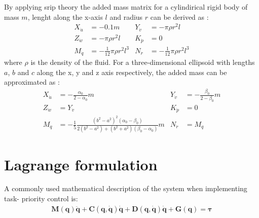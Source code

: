 By applying srip theory the added mass matrix for a cylindirical rigid body of
mass $m$, lenght along the x-axis $l$ and radius $r$ can be derived as \cite{antonelli2018}:
\begin{align}
 X_{\dot{u}} &= -0.1 m &
 Y_{\dot{v}} &= -\pi \rho r^2 l \nonumber \\
 Z_{\dot{w}} &= -\pi \rho r^2 l &
 K_{\dot{p}} &= 0 \\
 M_{\dot{q}} &= -\frac{1}{12} \pi \rho r^2 l^3 &
 N_{\dot{r}} &= -\frac{1}{12} \pi \rho r^2 l^3 \nonumber
\end{align}
where $\rho$ is the density of the fluid. For a three-dimensional ellipsoid with
lengths $a$, $b$ and $c$ along the x, y and z axis respectively, the added mass
can be approximated as \cite{fossen2021}:
\begin{align}
 X_{\dot{u}} &= -\frac{\alpha_0}{2-\alpha_0}m &
 Y_{\dot{v}} &= -\frac{\beta_0}{2-\beta_0}m \nonumber \\
 Z_{\dot{w}} &= Y_{\dot{v}}&
 K_{\dot{p}} &= 0 \\
 M_{\dot{q}} &= -\frac{1}{5}\frac{(b^2-a^2)^2(\alpha_0-\beta_0)}{2(b^2-a^2) + (b^2+a^2)(\beta_0-\alpha_0)}m&
 N_{\dot{r}} &= M_{\dot{q}} \nonumber
\end{align}

\section{Lagrange formulation}

A commonly used mathematical description of the system when implementing task-
priority control is:
\begin{align}
    \bm{M}(\bm{q})\ddot{\bm{q}} + \bm{C}(\bm{q}, \dot{\bm{q}})\dot{\bm{q}} + \bm{D}(\bm{q}, \dot{\bm{q}})\dot{\bm{q}} + \bm{G}(\bm{q}) = \bm{\tau}
\end{align}


